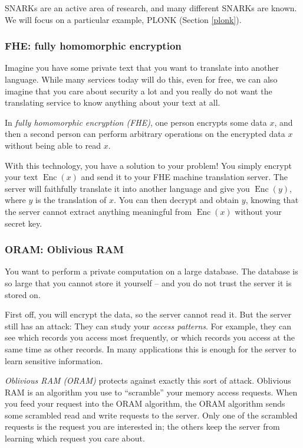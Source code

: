 SNARKs are an active area of research, and many different SNARKs are
known. We will focus on a particular example, PLONK (Section \ref{plonk}).

\subsubsection{FHE: fully homomorphic encryption}

Imagine you have some private text that you want to translate into
another language. While many services today will do this, even for free,
we can also imagine that you care about security a lot and you really do
not want the translating service to know anything about your text at
all.

In \emph{fully homomorphic encryption (FHE)}, one person encrypts some
data \(x\), and then a second person can perform arbitrary operations on
the encrypted data \(x\) without being able to read \(x\).

With this technology, you have a solution to your problem! You simply
encrypt your text \(\operatorname{Enc}(x)\) and send it to your FHE
machine translation server. The server will faithfully translate it into
another language and give you \(\operatorname{Enc}(y)\), where \(y\) is
the translation of \(x\). You can then decrypt and obtain \(y\), knowing
that the server cannot extract anything meaningful from
\(\operatorname{Enc}(x)\) without your secret key.

\subsubsection{ORAM: Oblivious RAM}

You want to perform a private computation on a large database. The
database is so large that you cannot store it yourself -- and you do not
trust the server it is stored on.

First off, you will encrypt the data, so the server cannot read it. But
the server still has an attack: They can study your \emph{access
patterns}. For example, they can see which records you access most
frequently, or which records you access at the same time as other
records. In many applications this is enough for the server to learn
sensitive information.

\emph{Oblivious RAM (ORAM)} protects against exactly this sort of
attack. Oblivious RAM is an algorithm you use to ``scramble'' your
memory access requests. When you feed your request into the ORAM
algorithm, the ORAM algorithm sends some scrambled read and write
requests to the server. Only one of the scrambled requests is the
request you are interested in; the others keep the server from learning
which request you care about.


